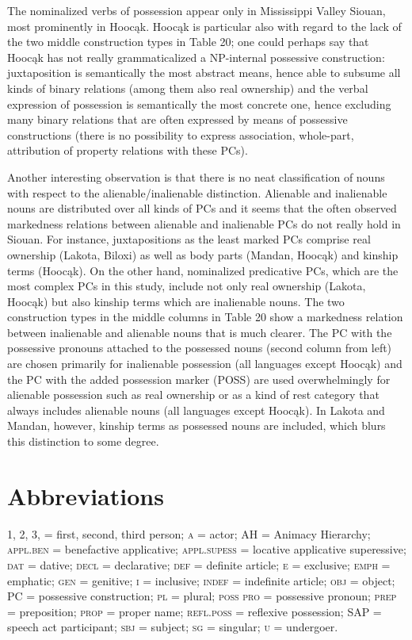 \documentclass[output=paper]{LSP/langsci}
\begin{document}
The nominalized verbs of possession appear only in Mississippi Valley Siouan, most prominently in Hoocąk. Hoocąk is particular also with regard to the lack of the two middle construction types in Table 20; one could perhaps say that Hoocąk has not really grammaticalized a NP-internal possessive construction:  juxtaposition is semantically the most abstract means, hence able to subsume all kinds of binary relations (among them also real ownership) and the verbal expression of possession is semantically the most concrete one, hence excluding many binary relations that are often expressed by means of possessive constructions (there is no possibility to express association, whole-part, attribution of property relations with these PCs).

Another interesting observation is that there is no neat classification of nouns with respect to the alienable/inalienable distinction. Alienable and inalienable nouns are distributed over all kinds of PCs and it seems that the often observed markedness relations between alienable and inalienable PCs do not really hold in Siouan. For instance, juxtapositions as the least marked PCs comprise real ownership (Lakota, Biloxi) as well as body parts (Mandan, Hoocąk) and kinship terms (Hoocąk). On the other hand, nominalized predicative PCs, which are the most complex PCs in this study, include not only real ownership (Lakota, Hoocąk) but also kinship terms which are inalienable nouns. The two construction types in the middle columns in Table 20 show a markedness relation between inalienable and alienable nouns that is much clearer. The PC with the possessive pronouns attached to the possessed nouns (second column from left) are chosen primarily for inalienable possession (all languages except Hoocąk) and the PC with the added possession marker (POSS) are used overwhelmingly for alienable possession such as real ownership or as a kind of rest category that always includes alienable nouns (all languages except Hoocąk). In Lakota and Mandan, however, kinship terms as possessed nouns are included, which blurs this distinction to some degree. 
   
\section*{Abbreviations}

1, 2, 3, = first, second, third person; \textsc{a} = actor; AH = Animacy Hierarchy; \textsc{appl.ben} = benefactive applicative; \textsc{appl.supess} = locative applicative superessive; \textsc{dat} = dative; \textsc{decl} = declarative; \textsc{def} = definite article; \textsc{e} = exclusive; \textsc{emph} = emphatic; \textsc{gen} = genitive; \textsc{i} = inclusive; \textsc{indef} = indefinite article; \textsc{obj} = object; PC = possessive construction; \textsc{pl} = plural; \textsc{poss pro} = possessive pronoun; \textsc{prep} = preposition; \textsc{prop} = proper name; \textsc{refl.poss} = reflexive possession; SAP = speech act participant; \textsc{sbj} = subject; \textsc{sg} = singular; \textsc{u} = undergoer.
   
\end{document}
